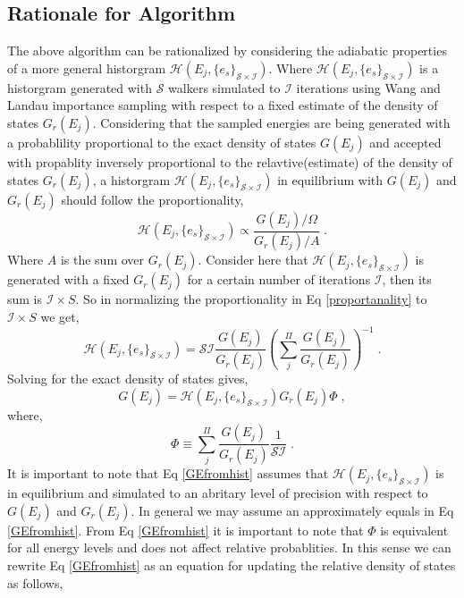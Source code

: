 \documentclass[aps,prl,reprint,superscriptaddress,showkeys]{revtex4-1}
\begin{document}
\subsection{Rationale for Algorithm}

The above algorithm can be rationalized by considering the adiabatic properties of a more general historgram $\mathcal{H}(E_j,\{e_s\}_{\mathcal{S}\times\mathcal{I}})$. Where  $\mathcal{H}(E_j,\{e_s\}_{\mathcal{S}\times\mathcal{I}})$ is a historgram generated with $\mathcal{S}$ walkers simulated to $\mathcal{I}$ iterations using Wang and Landau importance sampling with respect to  a fixed estimate of the density of states $G_r(E_j)$.  Considering that the sampled  energies are being generated with a probablility proportional to  the exact density of states $G(E_j)$ and accepted  with propablity inversely proportional to the relavtive(estimate) of the density of states $G_r(E_j)$, a historgram $\mathcal{H}(E_j,\{e_s\}_{\mathcal{S}\times\mathcal{I}})$ in equilibrium with $G(E_j)$ and $G_r(E_j)$ should follow the proportionality, 
\begin{equation}
\mathcal{H}(E_j,\{e_s\}_{\mathcal{S}\times\mathcal{I}}) \propto   \frac{G(E_j)/\Omega}{G_r(E_j)/A} \; .
\label{proportanality}
\end{equation}
Where $A$ is the sum over $G_r(E_j)$. Consider here that $\mathcal{H}(E_j,\{e_s\}_{\mathcal{S}\times\mathcal{I}})$ is generated with a fixed $G_r(E_j)$ for a certain number of iterations $\mathcal{I}$, then its sum is $\mathcal{I}\times S$.  So in normalizing the proportionality in Eq \ref{proportanality} to $\mathcal{I}\times S$ we get,
\begin{equation}
\mathcal{H}(E_j,\{e_s\}_{\mathcal{S}\times\mathcal{I}}) =  \mathcal{S I}\frac{G(E_j)}{G_r(E_j)}  (\sum_j^{\Pi}\frac{G(E_j)}{G_r(E_j)})^{-1} \;.
\end{equation}
Solving for the exact density of states gives,
\begin{equation}
G(E_j) = \mathcal{H}(E_j,\{e_s\}_{\mathcal{S}\times\mathcal{I}}) G_r(E_j)  \Phi \;,
\label{GEfromhist}
\end{equation}
where,
\begin{equation}
  \Phi \equiv \sum_j^{\Pi}\frac{G(E_j)}{G_r(E_j)}\frac{1}{\mathcal{S I}} \;. 
 \end{equation}
 It is important to note that Eq \ref{GEfromhist} assumes that $\mathcal{H}(E_j,\{e_s\}_{\mathcal{S}\times\mathcal{I}})$ is in equilibrium and simulated to an abritary level of precision with respect to $G(E_j)$ and $G_r(E_j)$. In general we may assume an approximately equals in Eq \ref{GEfromhist}.  From Eq \ref{GEfromhist} it is important to note that $\Phi$ is equivalent for all energy levels and does not affect relative probablities.  In this sense we can rewrite  Eq \ref{GEfromhist} as an equation for updating the relative density of states as follows, 
\end{document}
